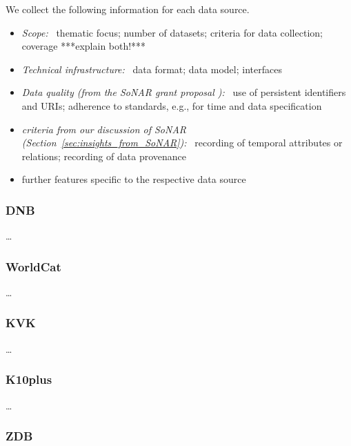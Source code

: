 We collect the following information for each data source.
%
\begin{itemize}
  \item
    \emph{Scope:}~
    thematic focus; number of datasets; criteria for data collection; coverage ***explain both!***
  \item
    \emph{Technical infrastructure:}~
    data format; data model; interfaces
  \item
    \emph{Data quality (from the \gls{SoNAR} grant proposal \autocite[p.\,19ff.]{SchneiderKempf2018}):}~
    use of persistent identifiers and URIs; adherence to standards, e.g., for time and data specification
  \item
    \emph{criteria from our discussion of \gls{SoNAR} (Section~\ref{sec:insights_from_SoNAR}):}~
    recording of temporal attributes or relations; recording of data provenance
  \item
    further features specific to the respective data source
\end{itemize}

\subsubsection{DNB}

\dots


\subsubsection{WorldCat}

\dots

\subsubsection{KVK}

\dots

\subsubsection{K10plus}

\dots

\subsubsection{ZDB}

